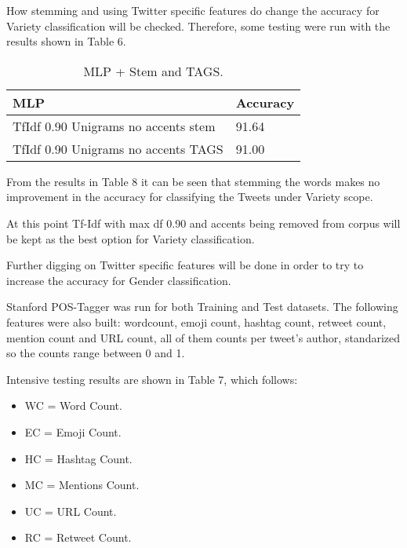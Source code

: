 \documentclass[11pt,a4paper]{article}
\begin{document}
How stemming and using Twitter specific features do change the accuracy for Variety classification will be checked. Therefore, some testing were run with the results shown in Table 6.

\begin{table}[htbp]
\begin{center}
\begin{tabular}{|l|l|}
\hline
MLP & Accuracy \\
\hline \hline
TfIdf 0.90 Unigrams no accents stem & 91.64 \\ \hline
TfIdf 0.90 Unigrams no accents TAGS & 91.00 \\ \hline
\end{tabular}
\caption{MLP + Stem and TAGS.}
\label{tabla:sencilla}
\end{center}
\end{table}

From the results in Table 8 it can be seen that stemming the words makes no improvement in the accuracy for classifying the Tweets under Variety scope.

At this point Tf-Idf with max df 0.90 and accents being removed from corpus will be kept as the best option for Variety classification.

Further digging on Twitter specific features will be done in order to try to increase the accuracy for Gender classification.

Stanford POS-Tagger was run for both Training and Test datasets. The following features were also built: wordcount, emoji count, hashtag count, retweet count, mention count  and URL count, all of them counts per tweet's author, standarized so the counts range between 0 and 1.

Intensive testing results are shown in Table 7, which follows:
    \begin{itemize}
    \addtolength{\itemsep}{-1mm}
    \item WC = Word Count.
    \item EC = Emoji Count.
    \item HC = Hashtag Count.
    \item MC = Mentions Count.
    \item UC = URL Count.
    \item RC = Retweet Count.
    \end{itemize}
\end{document}
